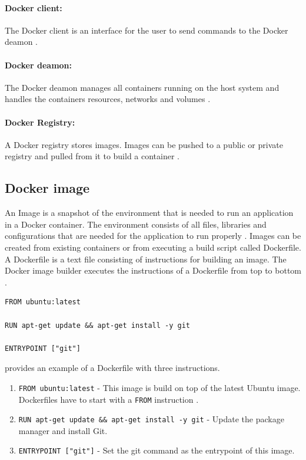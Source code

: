 \paragraph{Docker client:} The Docker client is an interface for the user to send commands to the Docker deamon \cite{Docker2020Docs}.


\paragraph{Docker deamon:} The Docker deamon manages all containers running on the host system and handles the containers resources, networks and volumes \cite{Bullington2020Docker}.


\paragraph{Docker Registry:} A Docker registry stores images. Images can be pushed to a public or private registry and pulled from it to build a container \cite{Docker2020Docs}.


\subsection{Docker image}
An Image is a snapshot of the environment that is needed to run an application in a Docker container. The environment consists of all files, libraries and configurations that are needed for the application to run properly \cite{Docker2020Docs, Nickoloff2019Docker}.
Images can be created from existing containers or from executing a build script called Dockerfile. A Dockerfile is a text file consisting of instructions for building an image. The Docker image builder executes the instructions of a Dockerfile from top to bottom \cite{Nickoloff2019Docker}.

\begin{lstlisting}[frame=single, label=lst:docker_dockerfile, caption=Example of a Dockerfile, captionpos=b]
FROM ubuntu:latest

RUN apt-get update && apt-get install -y git

ENTRYPOINT ["git"]
\end{lstlisting}

 provides an example of a Dockerfile with three instructions.
\begin{enumerate}
\item \texttt{FROM ubuntu:latest} - This image is build on top of the latest Ubuntu image. Dockerfiles have to start with a \texttt{FROM} instruction \cite{Nickoloff2019Docker}.
\item \texttt{RUN apt-get update \&\& apt-get install -y git} - Update the package manager and install Git.
\item \texttt{ENTRYPOINT ["git"]} - Set the git command as the entrypoint of this image.
\end{enumerate}

